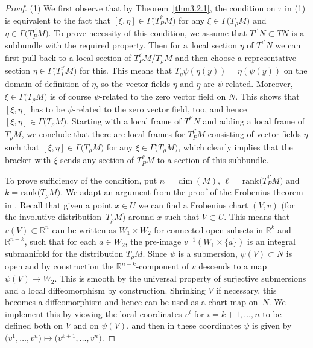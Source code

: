 \documentclass[pdftex]{sigma}
\numberwithin{equation}{section}
\def\Bbb{\mathbb}
\newcommand{\x}{\times}
\newcommand{\Ga}{\Gamma}
\begin{document}
\begin{proof}
 (1) We first observe that by Theorem~\ref{thm3.2.1}, the condition on $\tau$ in (1)
 is equivalent to the fact that $[\xi,\eta]\in\Ga\bigl(T^{i'}_PM\bigr)$ for any
 $\xi\in\Ga\bigl(T_\rho M\bigr)$ and $\eta\in\Ga\bigl(T^{i'}_PM\bigr)$. To prove necessity of this
 condition, we assume that $T^{i'}N\subset TN$ is a subbundle with the required
 property. Then for a~local section $\underline{\eta}$ of $T^{i'}N$ we can first
 pull back to a local section of $T^{i'}_PM/T_\rho M$ and then choose a
 representative section $\eta\in\Ga\bigl(T^{i'}_PM\bigr)$ for this. This means that
 $T_y\psi(\eta(y))=\underline{\eta}(\psi(y))$ on the domain of definition of $\eta$,
 so the vector fields $\eta$ and $\underline{\eta}$ are $\psi$-related. Moreover,
 $\xi\in\Ga\bigl(T_\rho M\bigr)$ is of course $\psi$-related to the zero vector field on
 $N$. This shows that $[\xi,\eta]$ has to be $\psi$-related to the zero vector
 field, too, and hence $[\xi,\eta]\in\Ga\bigl(T_\rho M\bigr)$. Starting with a local frame of
 $T^{i'}N$ and adding a local frame of $T_\rho M$, we conclude that there are local
 frames for $T^{i'}_PM$ consisting of vector fields $\eta$ such that
 $[\xi,\eta]\in\Ga\bigl(T_\rho M\bigr)$ for any $\xi\in\Ga\bigl(T_\rho M\bigr)$, which clearly implies
 that the bracket with $\xi$ sends any section of $T^{i'}_PM$ to a section of this
 subbundle.

To prove sufficiency of the condition, put $n=\dim(M)$, $\ell=\text{rank}\bigl(T^{i'}_PM\bigr)$
and $k=\text{rank}\bigl(T_\rho M\bigr)$. We adapt an argument from the proof of the Frobenius
theorem in \cite[Section 3.18]{Michor:topics}. Recall that given a point $x\in U$ we
can find a Frobenius chart $(V,v)$ (for the involutive distribution~$T_\rho M$)
around $x$ such that $V\subset U$. This means that $v(V)\subset\Bbb R^n$ can be
written as $W_1\x W_2$ for connected open subsets in $\Bbb R^k$ and $\Bbb R^{n-k}$,
such that for each $a\in W_2$, the pre-image $v^{-1}(W_1\x\{a\})$ is an integral
submanifold for the distribution $T_\rho M$. Since $\psi$ is a submersion,
$\psi(V)\subset N$ is open and by construction the $\Bbb R^{n-k}$-component of $v$
descends to a map $\psi(V)\to W_2$. This is smooth by the universal property of
surjective submersions and a local diffeomorphism by construction. Shrinking $V$ if
necessary, this becomes a diffeomorphism and hence can be used as a chart map on~$N$.
We implement this by viewing the local coordinates $v^i$ for $i=k+1,\dots, n$ to
be defined both on $V$ and on $\psi(V)$, and then in these coordinates $\psi$ is
given by $\bigl(v^1,\dots,v^n\bigr)\mapsto \bigl(v^{k+1},\dots,v^n\bigr)$.


\end{proof}
\end{document}
